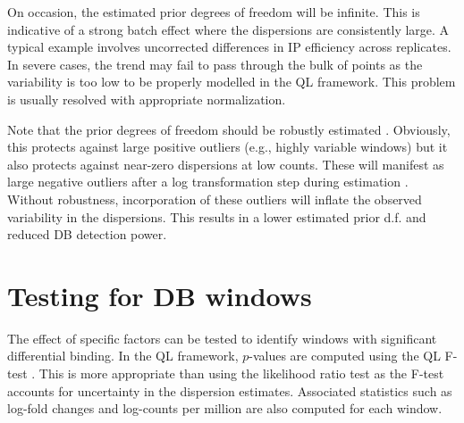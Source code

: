 \documentclass{report}\usepackage[]{graphicx}\usepackage[usenames,dvipsnames]{color}
\newcommand{\hlopt}[1]{\textcolor[rgb]{0,0,0}{#1}}%
\newcommand{\hlstd}[1]{\textcolor[rgb]{0.251,0.251,0.251}{#1}}%
\newcommand{\hlkwd}[1]{\textcolor[rgb]{0.878,0.439,0.125}{#1}}%
\newenvironment{knitrout}{}{} %
\begin{document}
\begin{knitrout}
\color{fgcolor}
\end{knitrout}

On occasion, the estimated prior degrees of freedom will be infinite. 
This is indicative of a strong batch effect where the dispersions are consistently large.
A typical example involves uncorrected differences in IP efficiency across replicates. 
In severe cases, the trend may fail to pass through the bulk of points as the variability is too low to be properly modelled in the QL framework.
This problem is usually resolved with appropriate normalization.

Note that the prior degrees of freedom should be robustly estimated \cite{phipson2016}. 
Obviously, this protects against large positive outliers (e.g., highly variable windows) but it also protects against near-zero dispersions at low counts. 
These will manifest as large negative outliers after a log transformation step during estimation \cite{smyth2004}. 
Without robustness, incorporation of these outliers will inflate the observed variability in the dispersions.
This results in a lower estimated prior d.f. and reduced DB detection power.


\section{Testing for DB windows}
The effect of specific factors can be tested to identify windows with significant differential binding. 
In the QL framework, $p$-values are computed using the QL F-test \cite{lund2012}. 
This is more appropriate than using the likelihood ratio test as the F-test accounts for uncertainty in the dispersion estimates. 
Associated statistics such as log-fold changes and log-counts per million are also computed for each window.
\end{document}
